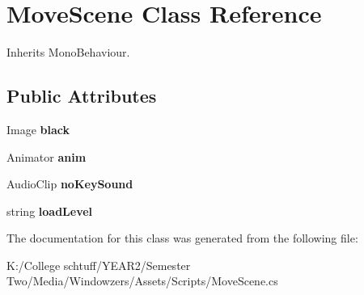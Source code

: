 \hypertarget{class_move_scene}{}\section{Move\+Scene Class Reference}
\label{class_move_scene}


Inherits Mono\+Behaviour.

\subsection*{Public Attributes}
\begin{DoxyCompactItemize}
\item 
\mbox{\label{class_move_scene_a4cfa2fcca351ee21e995e08be2778d82}} 
Image {\bfseries black}
\item 
\mbox{\label{class_move_scene_ae4aae39b61ac776d283195e8ede9012b}} 
Animator {\bfseries anim}
\item 
\mbox{\label{class_move_scene_afda9bb6363cfc004873932aa07a4978d}} 
Audio\+Clip {\bfseries no\+Key\+Sound}
\item 
\mbox{\label{class_move_scene_a2668275c84581b6ae21788b7c2eb630d}} 
string {\bfseries load\+Level}
\end{DoxyCompactItemize}


The documentation for this class was generated from the following file\+:\begin{DoxyCompactItemize}
\item 
K\+:/\+College schtuff/\+Y\+E\+A\+R2/\+Semester Two/\+Media/\+Windowzers/\+Assets/\+Scripts/Move\+Scene.\+cs\end{DoxyCompactItemize}
